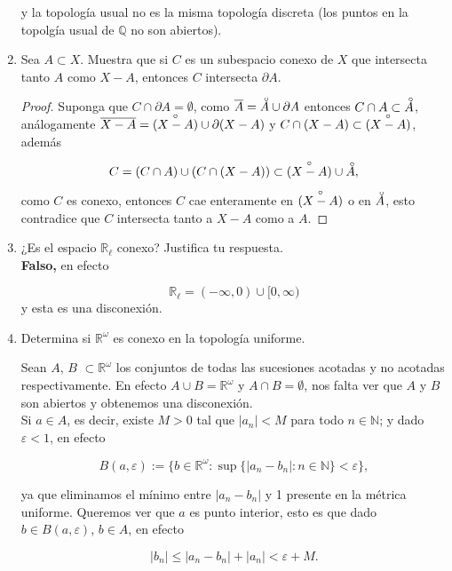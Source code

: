 \documentclass[11pt]{article}
\newcommand{\interior}[1]{\accentset{\smash{\raisebox{-0.12ex}{$\scriptstyle\circ$}}}{#1}\rule{0pt}{2.3ex}}
\begin{document}
\begin{enumerate}
y la topología usual  no es la misma topología discreta (los puntos en la topolgía usual de $\mathbb{Q}$ no son abiertos).

    \item Sea $A \subset X$. Muestra que si $C$ es un subespacio conexo de $X$ que intersecta tanto $A$ como $X - A$, entonces $C$ intersecta $\partial A$.

    \begin{proof}
        Suponga que $C\cap \partial A=\emptyset$, como $\overline{A}=\interior{A}\cup \partial A$ entonces $C\cap A\subset \interior{A}$, análogamente $\overline{X-A}=\interior{(X-A)}\cup \partial (X-A)$  y $C\cap (X-A)\subset \interior{(X-A)}$, además

        $$C=(C\cap A) \cup (C\cap (X-A))\subset \interior{(X-A)}\cup \interior{A},$$

        como $C$ es conexo, entonces $C$ cae enteramente en $\interior{(X-A)}$ o en $\interior{A}$, esto contradice que $C$ intersecta tanto a $X-A$ como a $A$.
    \end{proof}
    
    \item ¿Es el espacio $\mathbb{R}_\ell$ conexo? Justifica tu respuesta.\\
    
    \textbf{Falso,} en efecto 

    $$\mathbb{R}_{\ell}=(-\infty,0)\cup [0,\infty)$$
     y esta es una disconexión.

    \item Determina si $\mathbb{R}^\omega$ es conexo en la topología uniforme.


Sean $A$, $B$ $\subset\mathbb{R}^\omega$ los conjuntos de todas las sucesiones acotadas y  no acotadas respectivamente. En efecto $A \cup B = \mathbb{R}^\omega$ y $A \cap B = \emptyset$, nos falta ver que $A$ y $B$ son abiertos y obtenemos una disconexión.\\

Si $a \in A$, es decir, existe $M>0$ tal que $|a_n|<M$ para todo $n \in \mathbb{N}$; y dado $\varepsilon<1$, en efecto

$$B(a,\varepsilon):=\{b\in\mathbb{R}^{\omega}:\sup\{|a_n-b_n|:n\in\mathbb{N}\}<\varepsilon\},$$

ya que eliminamos el mínimo entre $|a_n-b_n|$ y 1 presente en la métrica uniforme. Queremos ver que $a$ es punto interior, esto es que dado $b\in B(a,\varepsilon)$, $b\in A$, en efecto

$$|b_n|\leq |a_n-b_n|+|a_n|<\varepsilon+M.$$


\end{enumerate}
\end{document}
